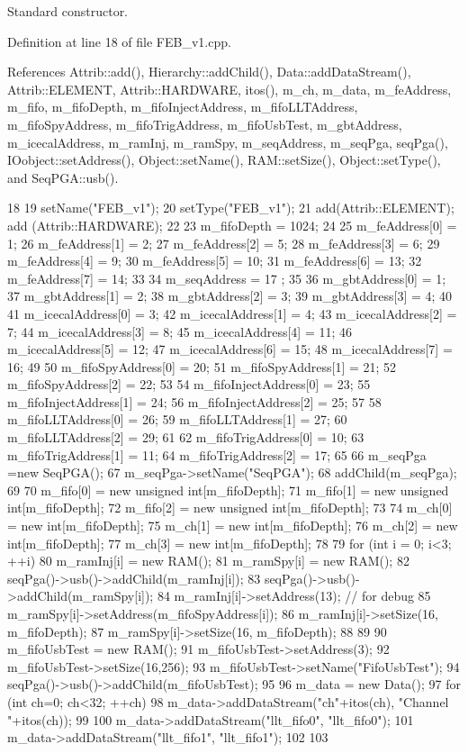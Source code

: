 Standard constructor. 

Definition at line 18 of file FEB\_\-v1.cpp.

References Attrib::add(), Hierarchy::addChild(), Data::addDataStream(), Attrib::ELEMENT, Attrib::HARDWARE, itos(), m\_\-ch, m\_\-data, m\_\-feAddress, m\_\-fifo, m\_\-fifoDepth, m\_\-fifoInjectAddress, m\_\-fifoLLTAddress, m\_\-fifoSpyAddress, m\_\-fifoTrigAddress, m\_\-fifoUsbTest, m\_\-gbtAddress, m\_\-icecalAddress, m\_\-ramInj, m\_\-ramSpy, m\_\-seqAddress, m\_\-seqPga, seqPga(), IOobject::setAddress(), Object::setName(), RAM::setSize(), Object::setType(), and SeqPGA::usb().


\begin{DoxyCode}
18                  {
19   setName("FEB_v1");
20   setType("FEB_v1");
21   add(Attrib::ELEMENT); add (Attrib::HARDWARE);
22 
23   m_fifoDepth = 1024;
24 
25   m_feAddress[0] = 1;
26   m_feAddress[1] = 2;
27   m_feAddress[2] = 5;
28   m_feAddress[3] = 6;
29   m_feAddress[4] = 9;
30   m_feAddress[5] = 10;
31   m_feAddress[6] = 13;
32   m_feAddress[7] = 14;
33 
34   m_seqAddress   = 17 ; 
35 
36   m_gbtAddress[0] = 1;
37   m_gbtAddress[1] = 2;
38   m_gbtAddress[2] = 3;
39   m_gbtAddress[3] = 4;
40     
41   m_icecalAddress[0] = 3;
42   m_icecalAddress[1] = 4;
43   m_icecalAddress[2] = 7;
44   m_icecalAddress[3] = 8;
45   m_icecalAddress[4] = 11;
46   m_icecalAddress[5] = 12;
47   m_icecalAddress[6] = 15;
48   m_icecalAddress[7] = 16;
49     
50   m_fifoSpyAddress[0] = 20;
51   m_fifoSpyAddress[1] = 21;
52   m_fifoSpyAddress[2] = 22;
53 
54   m_fifoInjectAddress[0] = 23;
55   m_fifoInjectAddress[1] = 24;
56   m_fifoInjectAddress[2] = 25;
57 
58   m_fifoLLTAddress[0] = 26;
59   m_fifoLLTAddress[1] = 27;
60   m_fifoLLTAddress[2] = 29;
61 
62   m_fifoTrigAddress[0] = 10;
63   m_fifoTrigAddress[1] = 11;
64   m_fifoTrigAddress[2] = 17;
65 
66   m_seqPga =new SeqPGA();
67   m_seqPga->setName("SeqPGA");
68   addChild(m_seqPga);
69 
70   m_fifo[0] = new unsigned int[m_fifoDepth];
71   m_fifo[1] = new unsigned int[m_fifoDepth];
72   m_fifo[2] = new unsigned int[m_fifoDepth];
73 
74   m_ch[0] = new int[m_fifoDepth];
75   m_ch[1] = new int[m_fifoDepth];
76   m_ch[2] = new int[m_fifoDepth];
77   m_ch[3] = new int[m_fifoDepth];
78 
79   for (int i = 0; i<3; ++i){
80     m_ramInj[i] = new RAM();
81     m_ramSpy[i] = new RAM();
82     seqPga()->usb()->addChild(m_ramInj[i]);
83     seqPga()->usb()->addChild(m_ramSpy[i]);
84     m_ramInj[i]->setAddress(13); // for debug
85     m_ramSpy[i]->setAddress(m_fifoSpyAddress[i]);
86     m_ramInj[i]->setSize(16, m_fifoDepth);
87     m_ramSpy[i]->setSize(16, m_fifoDepth);
88   }
89 
90   m_fifoUsbTest = new RAM();
91   m_fifoUsbTest->setAddress(3);
92   m_fifoUsbTest->setSize(16,256);
93   m_fifoUsbTest->setName("FifoUsbTest");
94   seqPga()->usb()->addChild(m_fifoUsbTest);
95 
96   m_data = new Data();
97   for (int ch=0; ch<32; ++ch){
98     m_data->addDataStream("ch"+itos(ch), "Channel "+itos(ch));
99   }
100   m_data->addDataStream("llt_fifo0", "llt_fifo0");
101   m_data->addDataStream("llt_fifo1", "llt_fifo1");
102   
103 }
\end{DoxyCode}
